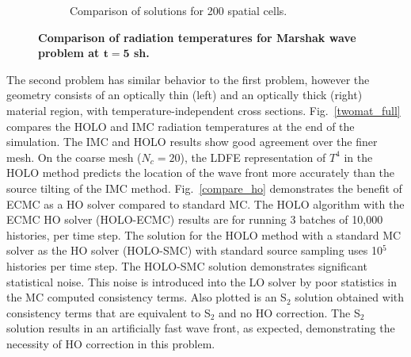 \documentclass[11pt]{article}
\begin{document}
\begin{figure}[H]
\begin{subfigure}{0.49\textwidth}
  \caption{\label{marshak_200_compare}  Comparison of solutions for 200 spatial cells. }
\end{subfigure}
\caption{\bf Comparison of radiation temperatures for Marshak wave problem at $\mathbf{t=5}$ sh.}
\end{figure}

The second problem has similar behavior to the first problem, however the geometry consists of an optically thin (left) and an optically thick (right) material region,
with temperature-independent cross sections.  Fig.~\ref{twomat_full} compares the HOLO and IMC radiation 
temperatures at the end of the simulation. The
IMC and HOLO results show good agreement
over the finer mesh.
On the coarse mesh ($N_c=20$), the LDFE representation of $T^4$ in the HOLO method predicts the location of the
wave front more accurately than the source tilting of the IMC method.
Fig.~\ref{compare_ho} demonstrates the benefit of ECMC as a HO solver compared to
standard MC.  The HOLO algorithm
with the ECMC HO solver (HOLO-ECMC) results
are for running 3 batches of 10,000 histories, per time step. The solution for the HOLO method with a standard MC solver as the HO solver
(HOLO-SMC) with standard source sampling uses 10$^5$ histories per time step. The HOLO-SMC solution demonstrates significant
statistical noise.  This noise is introduced into the LO solver by poor statistics in
the MC computed consistency terms. Also
plotted is an S$_2$ solution obtained with consistency terms that are equivalent
to S$_2$ and no HO correction.  The S$_2$ solution results in an artificially fast
wave front, as expected, demonstrating the necessity of HO correction in this problem.
\end{document}
